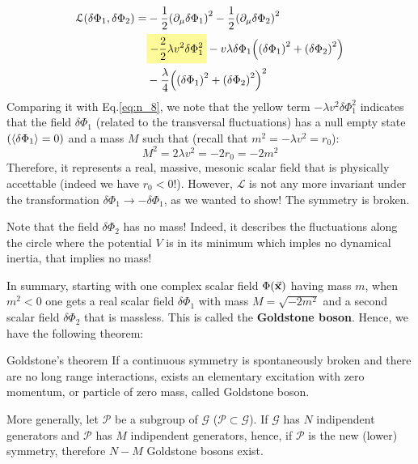 \documentclass[../main/main.tex]{subfiles}
\begin{document}
\begin{equation}
\begin{split}
\mathcal{L} \qty(\delta \Phi _1, \delta \Phi _2)   = &  - \frac{1}{2} \qty(\partial_ \mu  \delta \Phi _1 )^2 - \frac{1}{2} \qty(\partial_ \mu \delta \Phi _2 )^2   \\
& \mathcolorbox{yellow!40}{- \frac{2}{2} \lambda v^2 \delta \Phi _1^2} - v \lambda \delta \Phi _1 \qty( \qty(\delta \Phi _1)^2 + \qty(\delta \Phi _2 )^2  ) \\
& - \frac{\lambda }{4} \qty( \qty(\delta \Phi _1)^2 + \qty(\delta \Phi _2)^2  )^2
\end{split}
\end{equation}
Comparing it with Eq.\eqref{eq:n_8}, we note that the yellow term \( - \lambda v^2 \delta \Phi _1^2 \) indicates that the field \( \delta \Phi _1 \) (related to the transversal fluctuations) has a null empty state \( ( \expval{\delta \Phi _1}= 0 ) \) and a mass \( M \) such that (recall that \( m^2 = - \lambda v^2 = r_0 \)):
\begin{equation*}
  M^2 = 2 \lambda v^2 =  -2 r_0 = - 2m^2
\end{equation*}
Therefore, it represents a real, massive, mesonic scalar field that is physically accettable (indeed we have \( r_0<0 \)!).
However, \( \mathcal{L} \) is not any more invariant under the transformation \( \delta \Phi _1 \rightarrow - \delta \Phi _1 \), as we wanted to show! The symmetry is broken.


\begin{remark}
  Note that the field \( \delta \Phi _2 \) has no mass! Indeed, it describes the fluctuations along the circle where the potential \( V \) is in its minimum  which imples no dynamical inertia, that implies no mass!
\end{remark}

In summary, starting with one complex scalar field \( \Phi (\va{x}) \) having mass \( m \), when \( m^2 < 0 \) one gets a real scalar field \( \delta \Phi _1 \) with mass \( M = \sqrt{- 2 m^2}  \)  and a second scalar field \( \delta \Phi _2 \) that is massless. This is called the \textbf{Goldstone boson}. Hence, we have the following theorem:

\begin{theorem}{Goldstone's theorem}{}
If a continuous symmetry is spontaneously broken and there are no long range interactions, exists an elementary excitation with zero momentum, or particle of zero mass, called Goldstone boson.

More generally, let \( \mathcal{P} \) be a subgroup of \( \mathcal{G} \) (\( \mathcal{P} \subset \mathcal{G} \)). If \( \mathcal{G} \) has \( N \) indipendent generators and \( \mathcal{P} \)  has \( M \) indipendent generators, hence, if \( \mathcal{P} \) is the new (lower) symmetry, therefore \( N-M \)  Goldstone bosons exist.
\end{theorem}
\end{document}
